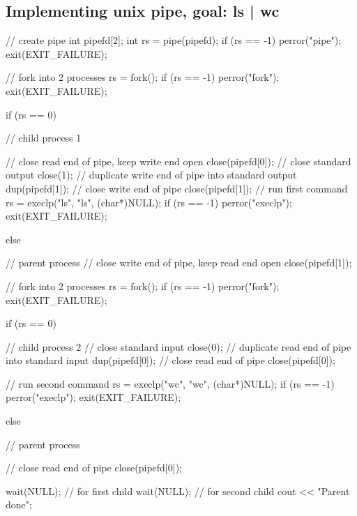 \documentclass{report}
\begin{document}
        \subsection{Implementing unix pipe, goal: ls | wc}
        \bigbreak \noindent 
        \begin{cppcode}

    // create pipe
	int pipefd[2];
	int rs = pipe(pipefd);
	if (rs == -1) { perror("pipe"); exit(EXIT_FAILURE); }
	
	// fork into 2 processes
	rs = fork();
	if (rs == -1) { perror("fork"); exit(EXIT_FAILURE); }

	if (rs == 0) { // child process	1
			
		// close read end of pipe, keep write end open
		close(pipefd[0]);
		// close standard output
		close(1);
		// duplicate write end of pipe into standard output
		dup(pipefd[1]);
		// close write end of pipe
		close(pipefd[1]);		
		// run first command
		rs = execlp("ls", "ls", (char*)NULL);
		if (rs == -1) { perror("execlp"); exit(EXIT_FAILURE); }	
				
	} 
        \end{cppcode}
        \pagebreak 
        \begin{cppcode}
            else {  // parent process
                // close write end of pipe, keep read end open
                close(pipefd[1]);

                // fork into 2 processes
                rs = fork();
                if (rs == -1) { perror("fork"); exit(EXIT_FAILURE); }

                if (rs == 0) { // child process	2
                    // close standard input
                    close(0);
                    // duplicate read end of pipe into standard input
                    dup(pipefd[0]);
                    // close read end of pipe
                    close(pipefd[0]);

                    // run second command
                    rs = execlp("wc", "wc", (char*)NULL);
                    if (rs == -1) { perror("execlp"); exit(EXIT_FAILURE); }

                } else { // parent process

                    // close read end of pipe
                    close(pipefd[0]);

                    wait(NULL); // for first child
                    wait(NULL); // for second child
                    cout << "Parent done\n";

                }
            }
        \end{cppcode}
\end{document}
